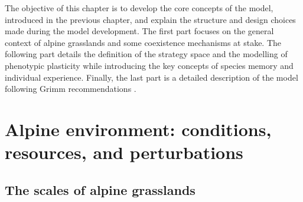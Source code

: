 %


\begin{fullwidth}
The objective of this chapter is to develop the core concepts of the model, introduced in the previous chapter, and explain the structure and design choices made during the model development. The first part focuses on the general context of alpine grasslands and some coexistence mechanisms at stake. The following part details the definition of the strategy space and the modelling of phenotypic plasticity while introducing the key concepts of species memory and individual experience. Finally, the last part is a detailed description of the model following Grimm recommendations \cite{grimm_standard_2006}.
\end{fullwidth}

\chapter{Alpine environment: conditions, resources, and perturbations}
\section{The scales of alpine grasslands}

